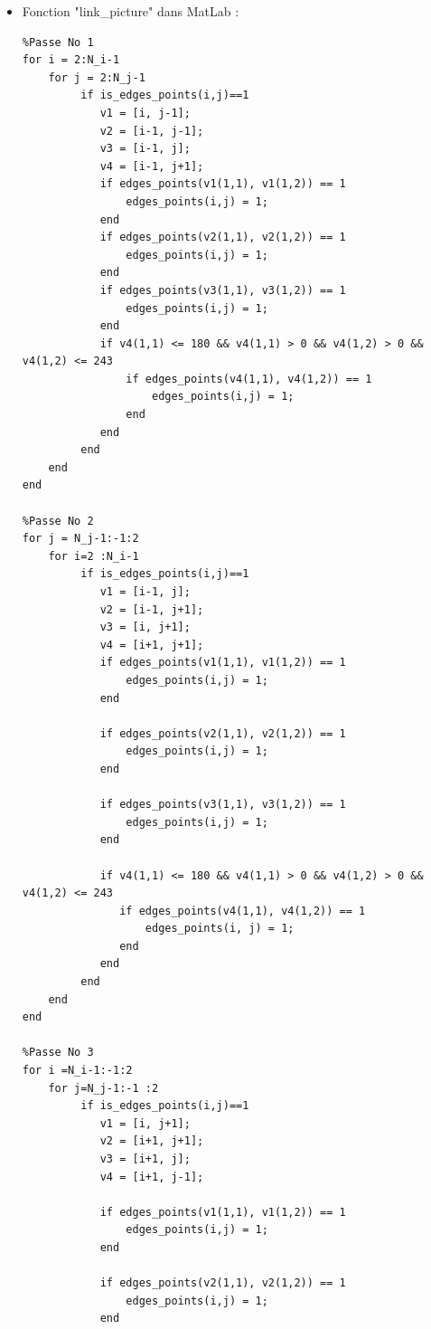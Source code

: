 \documentclass{article}
\begin{document}
\begin{itemize}\renewcommand{\labelitemi}{$\bullet$}
	\item Fonction "link\_picture" dans MatLab :
	
\begin{lstlisting}
%Passe No 1
for i = 2:N_i-1
    for j = 2:N_j-1
         if is_edges_points(i,j)==1
            v1 = [i, j-1];
            v2 = [i-1, j-1];
            v3 = [i-1, j];
            v4 = [i-1, j+1];
            if edges_points(v1(1,1), v1(1,2)) == 1
                edges_points(i,j) = 1;
            end
            if edges_points(v2(1,1), v2(1,2)) == 1
                edges_points(i,j) = 1;
            end
            if edges_points(v3(1,1), v3(1,2)) == 1
                edges_points(i,j) = 1;
            end 
            if v4(1,1) <= 180 && v4(1,1) > 0 && v4(1,2) > 0 && v4(1,2) <= 243
                if edges_points(v4(1,1), v4(1,2)) == 1 
                    edges_points(i,j) = 1;
                end
            end
         end
    end
end

%Passe No 2
for j = N_j-1:-1:2
    for i=2 :N_i-1
         if is_edges_points(i,j)==1
            v1 = [i-1, j];
            v2 = [i-1, j+1];
            v3 = [i, j+1];
            v4 = [i+1, j+1];
            if edges_points(v1(1,1), v1(1,2)) == 1
                edges_points(i,j) = 1;
            end
            
            if edges_points(v2(1,1), v2(1,2)) == 1
                edges_points(i,j) = 1;
            end
            
            if edges_points(v3(1,1), v3(1,2)) == 1
                edges_points(i,j) = 1;
            end
            
            if v4(1,1) <= 180 && v4(1,1) > 0 && v4(1,2) > 0 && v4(1,2) <= 243
               if edges_points(v4(1,1), v4(1,2)) == 1
                   edges_points(i, j) = 1;
               end
            end
         end
    end
end

%Passe No 3
for i =N_i-1:-1:2
    for j=N_j-1:-1 :2
         if is_edges_points(i,j)==1
            v1 = [i, j+1];
            v2 = [i+1, j+1];
            v3 = [i+1, j];
            v4 = [i+1, j-1];
                
            if edges_points(v1(1,1), v1(1,2)) == 1
                edges_points(i,j) = 1;
            end
            
            if edges_points(v2(1,1), v2(1,2)) == 1
                edges_points(i,j) = 1;
            end
            

\end{lstlisting}
\end{itemize}
\end{document}
